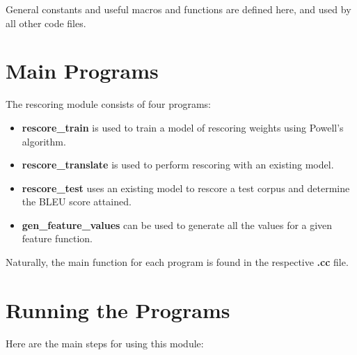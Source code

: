 \documentclass[12pt]{amsart}
\newcommand{\file}{\textbf} \newcommand{\url}{\underline}
\begin{document}
General constants and useful macros and functions are defined here, and used by
all other code files.

\section*{Main Programs}

The rescoring module consists of four programs:
\begin{itemize}
\item \textbf{rescore\_train} is used to train a model of rescoring weights
      using Powell's algorithm.
\item \textbf{rescore\_translate} is used to perform rescoring with an existing
      model.
\item \textbf{rescore\_test} uses an existing model to rescore a test corpus
      and determine the BLEU score attained.
\item \textbf{gen\_feature\_values} can be used to generate all the values for
      a given feature function.
\end{itemize}

Naturally, the main function for each program is found in the respective
\file{.cc} file.

\section*{Running the Programs}

Here are the main steps for using this module:
\end{document}
